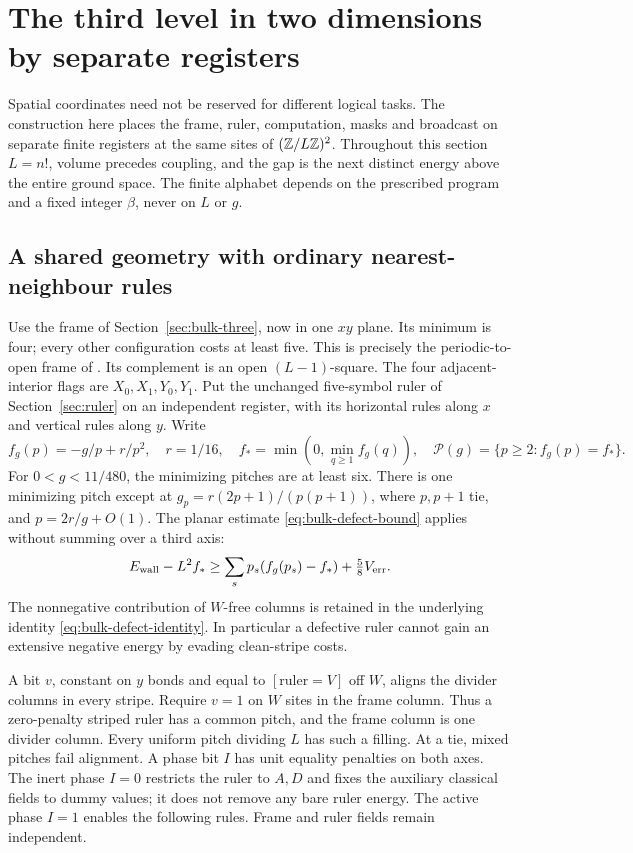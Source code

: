 \section{The third level in two dimensions by separate registers}
\label{sec:registers}
Spatial coordinates need not be reserved for different logical tasks.
The construction here places the frame, ruler, computation, masks and
broadcast on separate finite registers at the same sites of
$(\mathbb Z/L\mathbb Z)^2$. Throughout this section $L=n!$, volume precedes coupling,
and the gap is the next distinct energy above the entire ground space.
The finite alphabet depends on the prescribed program and a fixed integer
$\beta$, never on $L$ or $g$.

\subsection{A shared geometry with ordinary nearest-neighbour rules}
Use the frame of Section~\ref{sec:bulk-three}, now in one $xy$ plane.
Its minimum is four; every other configuration costs at least five.
This is precisely the periodic-to-open frame of
\cite[Section~6.3, equation~(133), Lemma~55]{spectralFull}.
Its complement is an open $(L-1)$-square. The four adjacent-interior
flags are $X_0,X_1,Y_0,Y_1$. Put the unchanged five-symbol ruler of
Section~\ref{sec:ruler} on an independent register, with its horizontal
rules along $x$ and vertical rules along $y$. Write
\[
 f_g(p)=-g/p+r/p^2,\quad r=1/16,\quad
 f_* =\min(0,\min_{q\geq1}f_g(q)),\quad
 \mathcal P(g)=\{p\geq2:f_g(p)=f_*\}.
\]
For $0<g<11/480$, the minimizing pitches are at least six.
There is one minimizing pitch except at
$g_p=r(2p+1)/(p(p+1))$, where $p,p+1$ tie, and
$p=2r/g+O(1)$. The planar estimate
\eqref{eq:bulk-defect-bound} applies without summing over a third axis:
\begin{equation}\label{eq:register-defect}
 E_{\rm wall}-L^2f_*\geq
 \sum_s p_s(f_g(p_s)-f_*)+\tfrac58 V_{\rm err}.
\end{equation}
The nonnegative contribution of $W$-free columns is retained in the
underlying identity \eqref{eq:bulk-defect-identity}.
In particular a defective ruler cannot gain an extensive negative
energy by evading clean-stripe costs.

A bit $v$, constant on $y$ bonds and equal to $[\text{ruler}=V]$
off $W$, aligns the divider columns in every stripe. Require $v=1$
on $W$ sites in the frame column. Thus a zero-penalty striped ruler
has a common pitch, and the frame column is one divider column.
Every uniform pitch dividing $L$ has such a filling. At a tie,
mixed pitches fail alignment. A phase bit $I$ has unit equality
penalties on both axes. The inert phase $I=0$ restricts the ruler
to $A,D$ and fixes the auxiliary classical fields to dummy values;
it does not remove any bare ruler energy. The active phase $I=1$
enables the following rules. Frame and ruler fields remain independent.

